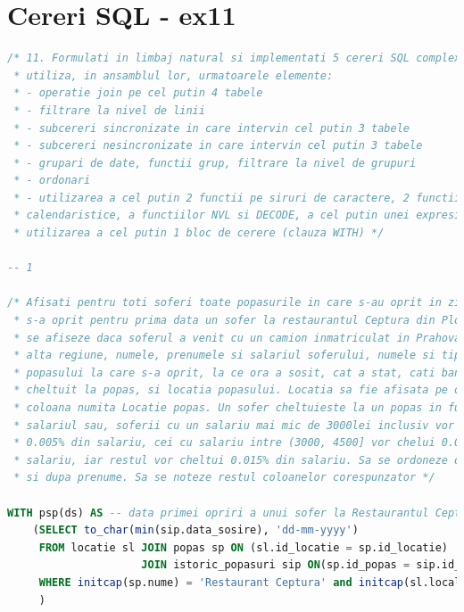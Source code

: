 \documentclass[12pt, a4paper]{article}
\begin{document}
\newpage
\section{Cereri SQL - ex11}
\begin{lstlisting}[language=SQL]
/* 11. Formulati in limbaj natural si implementati 5 cereri SQL complexe ce vor
 * utiliza, in ansamblul lor, urmatoarele elemente:
 * - operatie join pe cel putin 4 tabele
 * - filtrare la nivel de linii
 * - subcereri sincronizate in care intervin cel putin 3 tabele
 * - subcereri nesincronizate in care intervin cel putin 3 tabele
 * - grupari de date, functii grup, filtrare la nivel de grupuri
 * - ordonari
 * - utilizarea a cel putin 2 functii pe siruri de caractere, 2 functii pe date
 * calendaristice, a functiilor NVL si DECODE, a cel putin unei expresii CASE
 * utilizarea a cel putin 1 bloc de cerere (clauza WITH) */

-- 1

/* Afisati pentru toti soferi toate popasurile in care s-au oprit in ziua in care
 * s-a oprit pentru prima data un sofer la restaurantul Ceptura din Ploiesti, sa
 * se afiseze daca soferul a venit cu un camion inmatriculat in Prahova sau in
 * alta regiune, numele, prenumele si salariul soferului, numele si tipul
 * popasului la care s-a oprit, la ce ora a sosit, cat a stat, cati bani a
 * cheltuit la popas, si locatia popasului. Locatia sa fie afisata pe o singura
 * coloana numita Locatie popas. Un sofer cheltuieste la un popas in functie de
 * salariul sau, soferii cu un salariu mai mic de 3000lei inclusiv vor cheltui doar
 * 0.005% din salariu, cei cu salariu intre (3000, 4500] vor chelui 0.01% din
 * salariu, iar restul vor cheltui 0.015% din salariu. Sa se ordoneze dupa nume
 * si dupa prenume. Sa se noteze restul coloanelor corespunzator */

WITH psp(ds) AS -- data primei opriri a unui sofer la Restaurantul Ceptura din Ploiesti
    (SELECT to_char(min(sip.data_sosire), 'dd-mm-yyyy')
     FROM locatie sl JOIN popas sp ON (sl.id_locatie = sp.id_locatie)
                     JOIN istoric_popasuri sip ON(sp.id_popas = sip.id_popas)
     WHERE initcap(sp.nume) = 'Restaurant Ceptura' and initcap(sl.localitate) = 'Ploiesti'
     )


\end{lstlisting}
\end{document}

